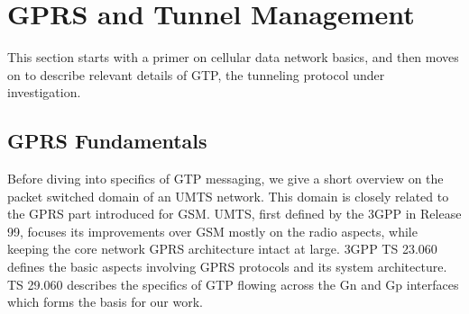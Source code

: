 

\section{GPRS and Tunnel Management}
\label{sec:gtp-CONEXT}
\acresetall
This section starts with a primer on cellular data network basics, and then moves on to describe relevant details of \ac{GTP}, the tunneling protocol under investigation.



\subsection{\acs{GPRS} Fundamentals}

Before diving into specifics of \ac{GTP} messaging, we give a short overview on the packet switched domain of an \ac{UMTS} network. This domain is closely related to the \ac{GPRS} part introduced for \acs{GSM}. \ac{UMTS}, first defined by the \ac{3GPP} in Release 99, focuses its improvements over \ac{GSM} mostly on the radio aspects, while keeping the core network \ac{GPRS} architecture intact at large. \ac{3GPP} \ac{TS} 23.060 \cite{3gpp23060} defines the basic aspects involving \ac{GPRS} protocols and its system architecture. \ac{TS} 29.060 \cite{3gpp29060} describes the specifics of \ac{GTP} flowing across the Gn and Gp interfaces which forms the basis for our work.



